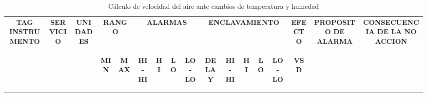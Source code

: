 \begin{table}
	\centering
	\caption{Cálculo de velocidad del aire ante cambios de temperatura y humedad}
	\label{velTH}
	\begin{tabular}{ccccccccccccccccc}
		\multirow{2}{*}{\textbf{TAG INSTRUMENTO}} & \multirow{2}{*}{\textbf{SERVICIO}} & \multirow{2}{*}{\textbf{UNIDADES}} & \multicolumn{2}{c}{\textbf{RANGO}}                                                      & \multicolumn{4}{c}{\textbf{ALARMAS}}                                                                                                                                                & \multicolumn{5}{c}{\textbf{ENCLAVAMIENTO}}                                                                                                                                                                                         & \textbf{EFECTO}                            & \textbf{PROPOSITO DE ALARMA}            & \textbf{CONSECUENCIA DE LA NO ACCION}  \\
		&                                    &                                    & \begin{sideways}\textbf{MIN}\end{sideways} & \begin{sideways}\textbf{MAX}\end{sideways} & \begin{sideways}\textbf{HI-HI}\end{sideways} & \begin{sideways}\textbf{HI}\end{sideways} & \begin{sideways}\textbf{LO}\end{sideways} & \begin{sideways}\textbf{LO-LO}\end{sideways} & \begin{sideways}\textbf{DELAY}\end{sideways} & \begin{sideways}\textbf{HI-HI}\end{sideways} & \begin{sideways}\textbf{HI}\end{sideways} & \begin{sideways}\textbf{LO}\end{sideways} & \begin{sideways}\textbf{LO-LO}\end{sideways} & \begin{sideways}\textbf{VSD}\end{sideways} &                                         &                                        \\

\end{tabular}
\end{table}
